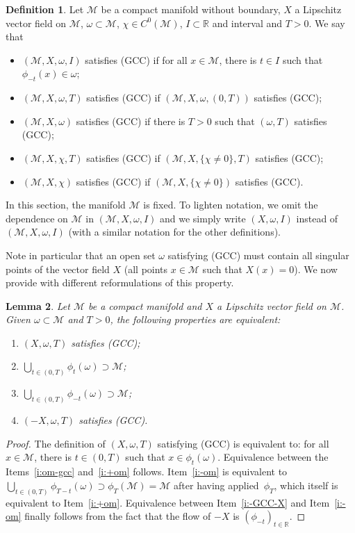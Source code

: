 \documentclass[10pt]{amsart}
\newcommand{\pGCC}{\textup{(GCC)}\xspace}
\newtheorem{lemma}{Lemma}[section]
\theoremstyle{definition}
\newtheorem{definition}[lemma]{Definition}
\newcommand{\M}{\ensuremath{\mathcal M}}
\newcommand{\mb}[1]{\ensuremath{\mathbb{#1}}}
\newcommand{\R}{{\mb{R}}}
\newcommand\bnp{\begin{proof}}
\newcommand\enp{\end{proof}}
\begin{document}
\begin{definition}
\label{d:def-GCC}
Let $\M$ be a compact manifold without boundary, $X$ a Lipschitz vector field on $\M$, $\omega \subset \M$, $\chi \in C^0(\M)$, $I\subset \R$ and interval and $T>0$. We say that
\begin{itemize}
\item $(\M,X, \omega,I)$ satisfies \pGCC if for all $x\in \M$, there is $t \in I$ such that $\phi_{-t}(x)\in \omega$;
\item $(\M,X, \omega,T)$ satisfies \pGCC if $(\M,X, \omega,(0,T))$ satisfies \pGCC;
\item $(\M,X, \omega)$ satisfies \pGCC if there is $T>0$ such that $(\omega,T)$ satisfies \pGCC;
\item $(\M,X, \chi,T)$ satisfies \pGCC if $(\M,X, \{\chi\neq 0\},T)$ satisfies \pGCC;
\item $(\M,X, \chi)$ satisfies \pGCC if $(\M,X, \{\chi\neq 0\})$ satisfies \pGCC.
\end{itemize}
\end{definition}
In this section, the manifold $\M$ is fixed. To lighten notation, we omit the dependence on $\M$ in $(\M,X, \omega,I)$ and we simply write $(X,\omega,I)$ instead of $(\M,X, \omega,I)$ (with a similar notation for the other definitions).

Note in particular that an open set $\omega$ satisfying \pGCC must contain all singular points of the vector field $X$ (\ie all points $x\in \M$ such that $X(x)=0$).
We now provide with different reformulations of this property.\enlargethispage{-\baselineskip}%
\begin{lemma}
\label{l:equiv-GCC}
Let $\M$ be a compact manifold and $X$ a Lipschitz vector field on $\M$.
Given $\omega \subset \M$ and $T>0$, the following properties are equivalent:
\begin{enumerate}
\item \label{i:om-gcc} $(X,\omega,T)$ satisfies \pGCC;
\item \label{i:+om} $\bigcup_{t\in (0,T)}\phi_t(\omega) \supset \M$;
\item \label{i:-om} $\bigcup_{t\in (0,T)}\phi_{-t}(\omega) \supset \M$;
\item \label{i:-GCC-X} $(-X,\omega,T)$ satisfies \pGCC.
\end{enumerate}
\end{lemma}
\bnp
The definition of $(X,\omega,T)$ satisfying \pGCC is equivalent to: for all \hbox{$x\in \M$}, there is $t \in (0,T)$ such that $x \in \phi_t(\omega)$.
Equivalence between the Items~\eqref{i:om-gcc} and~\eqref{i:+om} follows. Item~\eqref{i:-om} is equivalent to $\bigcup_{t\in (0,T)}\phi_{T-t}(\omega) \supset \phi_{T} (\M) = \M$ after having applied~$\phi_T$, which itself is equivalent to Item~\eqref{i:+om}. Equivalence between Item~\eqref{i:-GCC-X} and Item~\eqref{i:-om} finally follows from the fact that the flow of $-X$ is $(\phi_{-t})_{t\in \R}$.
\enp
\end{document}
